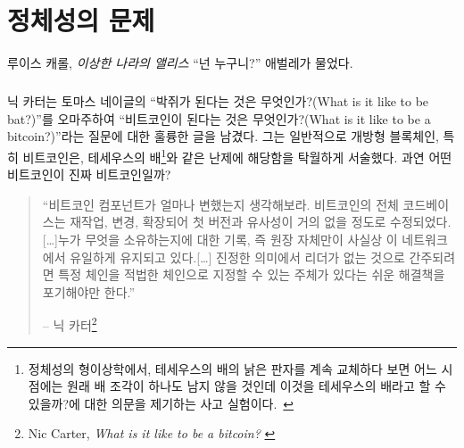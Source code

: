 \chapter{정체성의 문제}
\label{les:4}

\begin{chapquote}{루이스 캐롤, \textit{이상한 나라의 앨리스}}
	\enquote{넌 누구니?} 애벌레가 물었다.
\end{chapquote}

\paragraph{}
닉 카터는 토마스 네이글의 \enquote{박쥐가 된다는 것은 무엇인가?(What is it like to be bat?)}를 오마주하여 
\enquote{비트코인이 된다는 것은 무엇인가?(What is it like to be a bitcoin?)}라는 질문에 대한 훌륭한 글을 남겼다. 
그는 일반적으로 개방형 블록체인, 특히 비트코인은, 
테세우스의 배\footnote{정체성의 형이상학에서, 테세우스의 배의 낡은 판자를 계속 교체하다 보면 어느 시점에는 원래 배 조각이 하나도 남지 않을 것인데 이것을 테세우스의 배라고 할 수 있을까?에 대한
의문을 제기하는 사고 실험이다.~\cite{wiki:theseus}}와 같은 난제에 해당함을 탁월하게 서술했다.
과연 어떤 비트코인이 진짜 비트코인일까?

\begin{quotation}\begin{samepage}
		\enquote{비트코인 컴포넌트가 얼마나 변했는지 생각해보라. 
			비트코인의 전체 코드베이스는 재작업, 변경, 확장되어
			첫 버전과 유사성이 거의 없을 정도로 수정되었다.[\ldots]누가 무엇을 소유하는지에 대한
			기록, 즉 원장 자체만이 사실상 이 네트워크에서 유일하게 유지되고 있다.[\ldots]
			진정한 의미에서 리더가 없는 것으로 간주되려면 
			특정 체인을 적법한 체인으로 지정할 수 있는 주체가 있다는 쉬운 해결책을 포기해야만 한다.}
		\begin{flushright} -- 닉 카터\footnote{Nic Carter, \textit{What is it like to be a bitcoin?} \cite{bitcoin-identity}}
\end{flushright}\end{samepage}\end{quotation}

